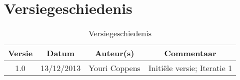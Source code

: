 \chapter{Versiegeschiedenis}

\begin{table}[htbp]
	\centering
	\begin{tabular} {|c|c|c|c|}
	    \hline
		\textbf{Versie} & \textbf{Datum} 	& \textbf{Auteur(s)} & \textbf{Commentaar} \\
		\hline
		1.0	& 13/12/2013	& Youri Coppens	& Initi\"{e}le versie; Iteratie 1\\ \hline
	\end{tabular}
	\caption{Versiegeschiedenis}
\end{table}